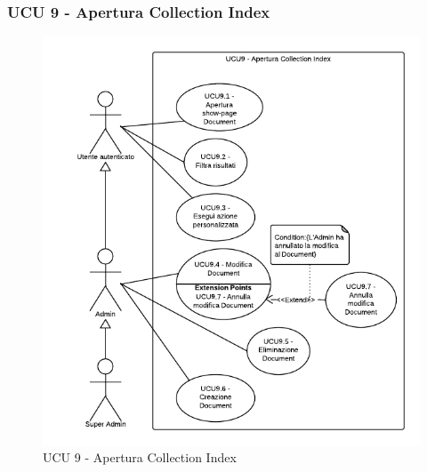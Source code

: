 \subsubsection{UCU 9 - Apertura Collection Index}    
    \begin{figure}[H]
      \begin{center}
      \includegraphics[width=12cm]{UML/UCU 9 - Apertura Collection Index.png}
      \caption{UCU 9 - Apertura Collection Index}
      \end{center} 
    \end{figure}    
    
